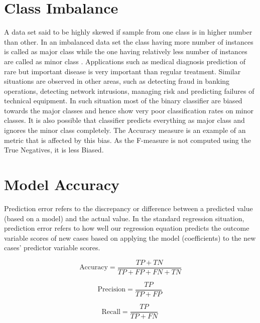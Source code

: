 \documentclass[12pt]{article}
\begin{document}
\section{Class Imbalance}
A data set said to be highly skewed if sample from one class is in higher number than other. In an imbalanced data set the class having more number of instances is called as major class while the one having relatively less number of instances are called as minor class .
Applications such as medical diagnosis prediction of rare but important disease is very important than regular treatment. Similar situations are observed in other areas, such as detecting fraud in banking operations, detecting network intrusions, managing risk and predicting failures of technical equipment. 
In such situation most of the binary classifier are biased towards the major classes and hence show very poor classification rates on minor classes. It is also possible that classifier predicts everything as major class and ignores the minor class completely.
The Accuracy measure is an example of an metric that is affected by this bias. As the F-measure is not computed using the True Negatives, it is less Biased.

\newpage
\section{Model Accuracy}
Prediction error refers to the discrepancy or difference between a predicted value (based on a
model) and the actual value. In the standard regression situation, prediction error refers to how
well our regression equation predicts the outcome variable scores of new cases based on
applying the model (coefficients) to the new cases’ predictor variable scores.

\begin{equation}
\text{Accuracy}=\frac{TP+TN}{TP+FP+FN+TN}
\end{equation}

\begin{equation}
\text{Precision}=\frac{TP}{TP+FP} \, 
\end{equation}

\begin{equation}
\text{Recall}=\frac{TP}{TP+FN} \, 
\end{equation}
\end{document}
